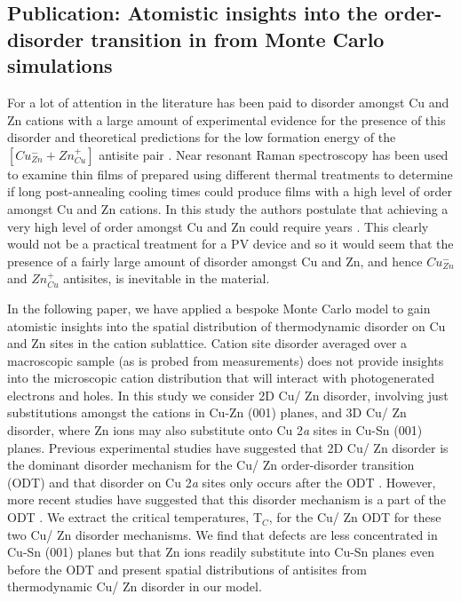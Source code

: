 \documentclass[11pt, twoside]{report}
\begin{document}
\subsection{Publication: Atomistic insights into the order-disorder transition in {\CZTS} from Monte Carlo simulations}\label{CZTS_MC}
For {\CZTS} a lot of attention in the literature has been paid to disorder amongst Cu and Zn cations with a large amount of experimental evidence for the presence of this disorder \cite{Schorr, CZTS_Xray, CZTS_TEM} and theoretical predictions for the low formation energy of the  $[Cu_{Zn}^{-} + Zn_{Cu}^{+}]$ antisite pair \cite{defects_Chen}.
Near resonant Raman spectroscopy has been used to examine thin films of {\CZTS} prepared using different thermal treatments to determine if long post-annealing cooling times could produce films with a high level of order amongst Cu and Zn cations. In this study the authors postulate that achieving a very high level of order amongst Cu and Zn could require years \cite{Katharina}. This clearly would not be a practical treatment for a PV device and so it would seem that the presence of a fairly large amount of disorder amongst Cu and Zn, and hence $Cu_{Zn}^{-}$ and $Zn_{Cu}^{+}$ antisites,  is inevitable in the material. 

In the following paper, we have applied a bespoke Monte Carlo model to gain atomistic insights into the spatial distribution of thermodynamic disorder on Cu and Zn sites in the cation sublattice. 
Cation site disorder averaged over a macroscopic sample (as is probed from measurements) does not provide insights into the microscopic cation distribution that will interact with photogenerated electrons and holes.
In this study we consider 2D Cu/ Zn disorder, involving just substitutions amongst the cations in Cu-Zn (001) planes, and 3D Cu/ Zn disorder, where Zn ions may also substitute onto Cu 2\textit{a} sites in Cu-Sn (001) planes. 
Previous experimental studies have suggested that 2D Cu/ Zn disorder is the dominant disorder mechanism for the Cu/ Zn order-disorder transition (ODT) and that disorder on Cu 2\textit{a} sites only occurs after the ODT \cite{disorder_july}. However, more recent studies have suggested that this disorder mechanism is a part of the ODT \cite{Cu2a_expt, Cu2a_theory}.
We extract the critical temperatures, T$_C$, for the Cu/ Zn ODT for these two Cu/ Zn disorder mechanisms. We find that defects are less concentrated in Cu-Sn (001) planes but that Zn ions readily substitute into Cu-Sn planes even before the ODT and present spatial distributions of antisites from thermodynamic Cu/ Zn disorder in our model.
\end{document}
